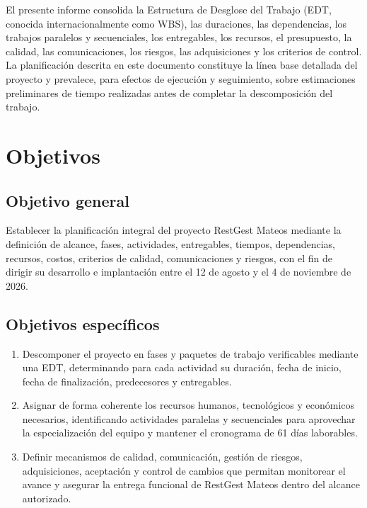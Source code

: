 \documentclass[12pt,a4paper]{article}
\begin{document}
El presente informe consolida la Estructura de Desglose del Trabajo (EDT, conocida internacionalmente como WBS), las duraciones, las dependencias, los trabajos paralelos y secuenciales, los entregables, 
los recursos, el presupuesto, la calidad, las comunicaciones, los riesgos, las adquisiciones y los criterios de control. 
La planificación descrita en este documento constituye la línea base detallada del proyecto y prevalece, para efectos de ejecución 
y seguimiento, sobre estimaciones preliminares de tiempo realizadas antes de completar la descomposición del trabajo.

\section{Objetivos}

\subsection{Objetivo general}

Establecer la planificación integral del proyecto RestGest Mateos mediante la definición de alcance, fases, actividades, entregables, 
tiempos, dependencias, recursos, costos, criterios de calidad, comunicaciones y riesgos, con el fin de dirigir su desarrollo e 
implantación entre el 12 de agosto y el 4 de noviembre de 2026.

\subsection{Objetivos específicos}

\begin{enumerate}
    \item Descomponer el proyecto en fases y paquetes de trabajo verificables mediante una EDT, determinando para cada actividad su duración, fecha de inicio, fecha de finalización, predecesores y entregables.
    \item Asignar de forma coherente los recursos humanos, tecnológicos y económicos necesarios, identificando actividades paralelas y secuenciales para aprovechar la especialización del equipo y mantener el cronograma de 61 días laborables.
    \item Definir mecanismos de calidad, comunicación, gestión de riesgos, adquisiciones, aceptación y control de cambios que permitan monitorear el avance y asegurar la entrega funcional de RestGest Mateos dentro del alcance autorizado.
\end{enumerate}
\end{document}

